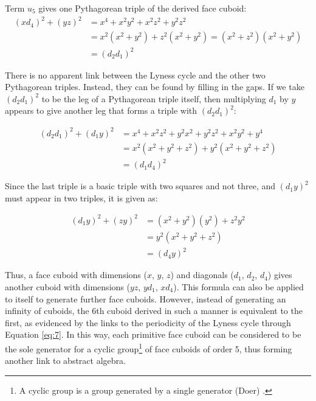 \documentclass[11pt]{article}
\begin{document}
Term $u_5$ gives one Pythagorean triple of the derived face cuboid:
\begin{equation*}
\begin{aligned}
(xd_4)^2+(yz)^2&=x^4+x^2y^2+x^2z^2+y^2z^2 \\
&=x^2(x^2+y^2)+z^2(x^2+y^2)=(x^2+z^2)(x^2+y^2) \\
&=(d_2d_1)^2
\end{aligned}
\end{equation*}

There is no apparent link between the Lyness cycle and the other two Pythagorean triples. Instead, they can be found by filling in the gaps. If we take $(d_2d_1)^2$ to be the leg of a Pythagorean triple itself, then multiplying $d_1$ by $y$ appears to give another leg that forms a triple with $(d_2d_1)^2$:

\begin{equation*}
\begin{aligned}
(d_2d_1)^2+(d_1y)^2&=x^4+x^2z^2+y^2x^2+y^2z^2+x^2y^2+y^4 \\
&=x^2(x^2+y^2+z^2)+y^2(x^2+y^2+z^2) \\
&=(d_1d_4)^2
\end{aligned}
\end{equation*}

Since the last triple is a basic triple with two squares and not three, and $(d_1y)^2$ must appear in two triples, it is given as:

\begin{equation*} 
\begin{aligned}
(d_1y)^2+(zy)^2&=(x^2+y^2)(y^2)+z^2y^2 \\
&=y^2(x^2+y^2+z^2) \\
&=(d_4y)^2
\end{aligned}
\end{equation*}

Thus, a face cuboid with dimensions ($x$, $y$, $z$) and diagonals ($d_1$, $d_2$, $d_4$) gives another cuboid with dimensions ($yz$, $yd_1$, $xd_4$). This formula can also be applied to itself to generate further face cuboids. However, instead of generating an infinity of cuboids, the 6th cuboid derived in such a manner is equivalent to the first, as evidenced by the links to the periodicity of the Lyness cycle through Equation \eqref{eq:7}. In this way, each primitive face cuboid can be considered to be the sole generator for a cyclic group\footnote{A cyclic group is a group generated by a single generator (Doer) \cite{cyclic}.} of face cuboids of order 5, thus forming another link to abstract algebra.
\end{document}
